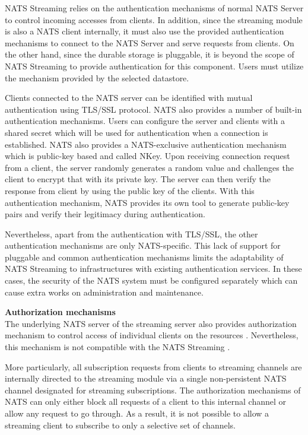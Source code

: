 NATS Streaming relies on the authentication mechanisms of normal NATS Server to control incoming accesses from clients. In addition, since the streaming module is also a NATS client internally, it must also use the provided authentication mechanisms to connect to the NATS Server and serve requests from clients. On the other hand, since the durable storage is pluggable, it is beyond the scope of NATS Streaming to provide authentication for this component. Users must utilize the mechanism provided by the selected datastore.

Clients connected to the NATS server can be identified with mutual authentication using TLS/SSL protocol. NATS also provides a number of built-in authentication mechanisms. Users can configure the server and clients with a shared secret which will be used for authentication when a connection is established. NATS also provides a NATS-exclusive authentication mechanism which is public-key based and called NKey. Upon receiving connection request from a client, the server randomly generates a random value and challenges the client to encrypt that with its private key. The server can then verify the response from client by using the public key of the clients. With this authentication mechanism, NATS provides its own tool to generate public-key pairs and verify their legitimacy during authentication.

Nevertheless, apart from the authentication with TLS/SSL, the other authentication mechanisms are only NATS-specific. This lack of support for pluggable and common authentication mechanisms limits the adaptability of NATS Streaming to infrastructures with existing authentication services. In these cases, the security of the NATS system must be configured separately which can cause extra works on administration and maintenance.

\textbf{Authorization mechanisms}\\
The underlying NATS server of the streaming server also provides authorization mechanism to control access of individual clients on the resources \cite{natssecurity}. Nevertheless, this mechanism is not compatible with the NATS Streaming \cite{natsauthorization}. 

More particularly, all subscription requests from clients to streaming channels are internally directed to the streaming module via a single non-persistent NATS channel designated for streaming subscriptions. The authorization mechanisms of NATS can only either block all requests of a client to this internal channel or allow any request to go through. As a result, it is not possible to allow a streaming client to subscribe to only a selective set of channels. 


